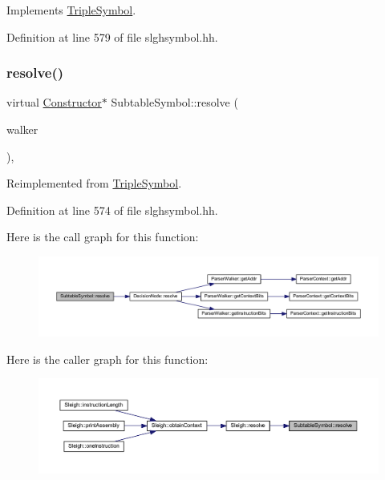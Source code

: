 Implements \mbox{\hyperlink{class_triple_symbol_a205c4487d3ad54532097dd77eb4501fc}{Triple\+Symbol}}.



Definition at line 579 of file slghsymbol.\+hh.

\mbox{\label{class_subtable_symbol_aeb4624a84c6ef3e18f8de1c43687373d}} 
\subsubsection{\texorpdfstring{resolve()}{resolve()}}
{\footnotesize\ttfamily virtual \mbox{\hyperlink{class_constructor}{Constructor}}$\ast$ Subtable\+Symbol\+::resolve (\begin{DoxyParamCaption}\item[{\mbox{\hyperlink{class_parser_walker}{Parser\+Walker}} \&}]{walker }\end{DoxyParamCaption})\hspace{0.3cm}{\ttfamily [inline]}, {\ttfamily [virtual]}}



Reimplemented from \mbox{\hyperlink{class_triple_symbol_adc7ba86d4674c1b3cc8894cfcac33bf1}{Triple\+Symbol}}.



Definition at line 574 of file slghsymbol.\+hh.

Here is the call graph for this function\+:
\nopagebreak
\begin{figure}[H]
\begin{center}
\leavevmode
\includegraphics[width=350pt]{class_subtable_symbol_aeb4624a84c6ef3e18f8de1c43687373d_cgraph}
\end{center}
\end{figure}
Here is the caller graph for this function\+:
\nopagebreak
\begin{figure}[H]
\begin{center}
\leavevmode
\includegraphics[width=350pt]{class_subtable_symbol_aeb4624a84c6ef3e18f8de1c43687373d_icgraph}
\end{center}
\end{figure}
\mbox{\label{class_subtable_symbol_ac7ee481c0b61d730dab915a4f80e8061}} 
